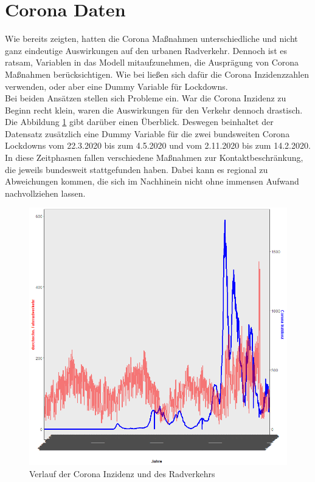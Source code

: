 \documentclass[a4paper,12pt]{thesis}
\begin{document}
\section{Corona Daten}

Wie \cite{Moellers2021} bereits zeigten, hatten die Corona Maßnahmen unterschiedliche und nicht ganz eindeutige Auswirkungen auf den urbanen Radverkehr. Dennoch ist es ratsam, Variablen in das Modell mitaufzunehmen, die Ausprägung von Corona Maßnahmen berücksichtigen. Wie bei \cite{Moellers2021} ließen sich dafür die Corona Inzidenzzahlen verwenden, oder aber eine Dummy Variable für Lockdowns.\\
Bei beiden Ansätzen stellen sich Probleme ein. War die Corona Inzidenz zu Beginn recht klein, waren die Auswirkungen für den Verkehr dennoch drastisch. Die Abbildung \ref{CoronaInzidenz} gibt darüber einen Überblick. Deswegen beinhaltet der Datensatz zusätzlich eine Dummy Variable für die zwei bundsweiten Corona Lockdowns vom 22.3.2020 bis zum 4.5.2020 und vom 2.11.2020 bis zum 14.2.2020. In diese Zeitphasnen fallen verschiedene Maßnahmen zur Kontaktbeschränkung, die jeweils bundesweit stattgefunden haben. Dabei kann es regional zu Abweichungen kommen, die sich im Nachhinein nicht ohne immensen Aufwand nachvollziehen lassen.

\begin{figure}[!ht]
	\centering
	\includegraphics[width=\textwidth]{Plots/plot62.png}
	\caption{Verlauf der Corona Inzidenz und des Radverkehrs}
	\label{CoronaInzidenz}
\end{figure}
\end{document}
